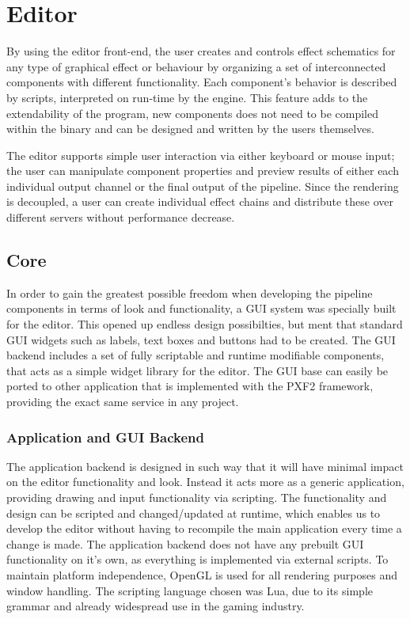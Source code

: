 
\chapter{Editor}
 
By using the editor front-end, the user creates and controls effect schematics for any type of graphical effect or behaviour by organizing a set of interconnected components with different functionality. Each component’s behavior is described by scripts, interpreted on run-time by the engine. This feature adds to the extendability of the program, new components does not need to be compiled within the binary and can be designed and written by the users themselves.

The editor supports simple user interaction via either keyboard or mouse input; the user can manipulate component properties and preview results of either each individual output channel or the final output of the pipeline. Since the rendering is decoupled, a user can create individual effect chains and distribute these over different servers without performance decrease. 

\section{Core}
In order to gain the greatest possible freedom when developing the pipeline components in terms of look and functionality, a GUI system was specially built for the editor. This opened up endless design possibilties, but ment that standard GUI widgets such as labels, text boxes and buttons had to be created. The GUI backend includes a set of fully scriptable and runtime modifiable components, that acts as a simple widget library for the editor. The GUI base can easily be ported to other application that is implemented with the PXF2 framework, providing the exact same service in any project. 

\subsection{Application and GUI Backend}
The application backend is designed in such way that it will have minimal impact on the editor functionality and look. Instead it acts more as a generic application, providing drawing and input functionality via scripting. The functionality and design can be scripted and changed/updated at runtime, which enables us to develop the editor without having to recompile the main application every time a change is made. The application backend does not have any prebuilt GUI functionality on it's own, as everything is implemented via external scripts. To maintain platform independence, OpenGL is used for all rendering purposes and window handling. The scripting language chosen was Lua, due to its simple grammar and already widespread use in the gaming industry.

